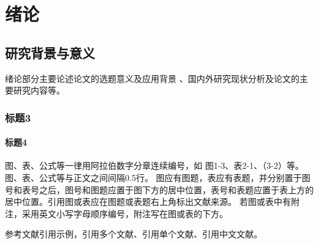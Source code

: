\chapter{绪论}
\section{研究背景与意义}
绪论部分主要论述论文的选题意义及应用背景 、国内外研究现状分析及论文的主要研究内容等。
\subsection{标题3}
\subsubsection{标题4}
图、表、公式等一律用阿拉伯数字分章连续编号，如 图1-3、表2-1、（3-2）等。图、表、公式等与正文之间间隔0.5行。
图应有图题，表应有表题，并分别置于图号和表号之后，图号和图题应置于图下方的居中位置，表号和表题应置于表上方的居中位置。引用图或表应在图题或表题右上角标出文献来源。
若图或表中有附注，采用英文小写字母顺序编号，附注写在图或表的下方。

参考文献引用示例，引用多个文献\cite{wu2013towards,snavely2008modeling}、引用单个文献\cite{wu2013towards}、引用中文文献\cite{任晓宇2018基于结构光的全自动三维扫描系统,周晓东圆柱度误差的结构光视觉测量技术研究}。


